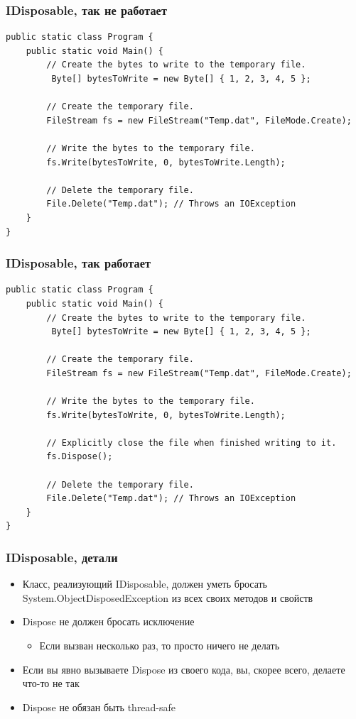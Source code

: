 \documentclass[xetex,mathserif,serif]{beamer}
\begin{document}
	\begin{frame}[fragile]
		\frametitle{IDisposable, так не работает}
		\begin{scriptsize}
			\begin{verbatim}
public static class Program {
    public static void Main() {
        // Create the bytes to write to the temporary file.
         Byte[] bytesToWrite = new Byte[] { 1, 2, 3, 4, 5 };

        // Create the temporary file.
        FileStream fs = new FileStream("Temp.dat", FileMode.Create);

        // Write the bytes to the temporary file.
        fs.Write(bytesToWrite, 0, bytesToWrite.Length);

        // Delete the temporary file.
        File.Delete("Temp.dat"); // Throws an IOException
    }
}
			\end{verbatim}
		\end{scriptsize}
	\end{frame}

	\begin{frame}[fragile]
		\frametitle{IDisposable, так работает}
		\begin{scriptsize}
			\begin{verbatim}
public static class Program {
    public static void Main() {
        // Create the bytes to write to the temporary file.
         Byte[] bytesToWrite = new Byte[] { 1, 2, 3, 4, 5 };

        // Create the temporary file.
        FileStream fs = new FileStream("Temp.dat", FileMode.Create);

        // Write the bytes to the temporary file.
        fs.Write(bytesToWrite, 0, bytesToWrite.Length);

        // Explicitly close the file when finished writing to it.
        fs.Dispose();

        // Delete the temporary file.
        File.Delete("Temp.dat"); // Throws an IOException
    }
}
			\end{verbatim}
		\end{scriptsize}
	\end{frame}

	\begin{frame}
		\frametitle{IDisposable, детали}
		\begin{itemize}
			\item Класс, реализующий IDisposable, должен уметь бросать System.ObjectDisposedException из всех своих методов и свойств
			\item Dispose не должен бросать исключение
			\begin{itemize}
				\item Если вызван несколько раз, то просто ничего не делать
			\end{itemize}
			\item Если вы явно вызываете Dispose из своего кода, вы, скорее всего, делаете что-то не так
			\item Dispose не обязан быть thread-safe
		\end{itemize}
	\end{frame}
\end{document}
